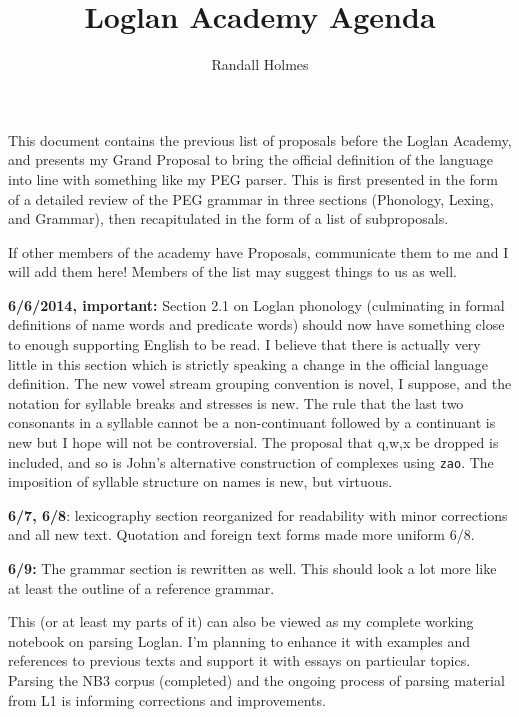 \documentclass[12pt]{article}
\title{Loglan Academy Agenda}
\author{Randall Holmes}
\begin{document}
\maketitle

\tableofcontents

\vspace{.5 in}

This document contains the previous list of proposals before the Loglan Academy, and presents my Grand Proposal to bring the official
definition of the language into line with something like my PEG parser.  This is first presented in the form of a detailed review of the PEG grammar in three sections (Phonology, Lexing, and Grammar), then recapitulated in the form of a list of subproposals.

If other members of the academy have Proposals, communicate them to me and I will add them here!  Members of the list may suggest things to us as well.

{\bf 6/6/2014, important:}  Section 2.1 on Loglan phonology (culminating in formal definitions of name words
and predicate words) should now have something close to enough supporting English to be read.  I believe
that there is actually very little in this section which is strictly speaking a change in the official language definition.
The new vowel stream grouping convention is novel, I suppose, and the notation for syllable breaks and stresses is new.  The rule that the last two consonants in a syllable cannot be a non-continuant followed by a continuant is new but I hope will not be controversial.  The proposal that q,w,x be dropped is included, and so is John's alternative construction of complexes using {\tt zao}.  The imposition of syllable structure on names is new, but virtuous.

{\bf 6/7, 6/8}: lexicography section reorganized for readability with minor corrections and all new text.  Quotation and foreign text forms made more uniform 6/8.

{\bf 6/9:}  The grammar section is rewritten as well.  This should look a lot more like at least the outline of a reference grammar.

This (or at least my parts of it) can also be viewed as my complete working notebook on parsing Loglan.  I'm planning to enhance it with examples and references to previous texts and support it with essays on particular topics.   Parsing the NB3 corpus (completed) and the ongoing process of parsing material from L1 is informing corrections and improvements.
\end{document}
